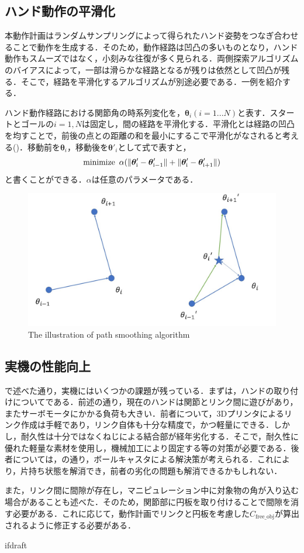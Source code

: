 \documentclass[a4paper,twoside,12pt,papersize, dvipdfmx]{iirthesis}
\begin{document}
\subsection*{ハンド動作の平滑化}
本動作計画はランダムサンプリングによって得られたハンド姿勢をつなぎ合わせることで動作を生成する．そのため，動作経路は凹凸の多いものとなり，ハンド動作もスムーズではなく，小刻みな往復が多く見られる．両側探索アルゴリズムのバイアスによって，一部は滑らかな経路となるが残りは依然として凹凸が残る．そこで，経路を平滑化するアルゴリズムが別途必要である．一例を紹介する．\par
ハンド動作経路における関節角の時系列変化を，$\bm{\theta}_i (i=1...N)$と表す．スタートとゴールの$i=1, N$は固定し，間の経路を平滑化する．平滑化とは経路の凹凸を均すことで，前後の点との距離の和を最小にするこで平滑化がなされると考える()．移動前を$\bm{\theta}_i$，移動後を$\bm{\theta}'_i$として式で表すと，
\begin{equation}
\rm{minimize} \,\,\, \alpha(\|\bm{\theta}'_i -\bm{\theta}'_{i-1}\| +  \|\bm{\theta}'_i -\bm{\theta}'_{i+1}\|)
\end{equation}
と書くことができる．$\alpha$は任意のパラメータである．\par
\begin{figure}
\centering
\includegraphics[width=0.5\hsize]{fig/5-conclusion/diagram.jpg}
\caption{The illustration of path smoothing algorithm}
\label{fig::conclusion::pathsmooth}
\end{figure}

\subsection*{実機の性能向上}
で述べた通り，実機にはいくつかの課題が残っている．まずは，ハンドの取り付けについてである．前述の通り，現在のハンドは関節とリンク間に遊びがあり，またサーボモータにかかる負荷も大きい．前者について，3Dプリンタによるリンク作成は手軽であり，リンク自体も十分な精度で，かつ軽量にできる．しかし，耐久性は十分ではなくねじによる結合部が経年劣化する．そこで，耐久性に優れた軽量な素材を使用し，機械加工により固定する等の対策が必要である．後者については，の通り，ボールキャスタによる解決策が考えられる．これにより，片持ち状態を解消でき，前者の劣化の問題も解消できるかもしれない．\par
また，リンク間に間隙が存在し，マニピュレーション中に対象物の角が入り込む場合があることも述べた．そのため，関節部に円板を取り付けることで間隙を消す必要がある．これに応じて，動作計画でリンクと円板を考慮した$C_{\mathrm {free\_obj}}$が算出されるように修正する必要がある．


\expandafter\ifx\csname ifdraft\endcsname\relax
    
\end{document}
